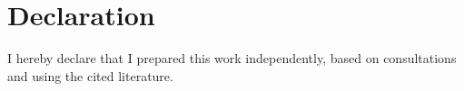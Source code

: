 \thispagestyle{empty}


\section*{Declaration}

\vspace*{\fill}

I hereby declare that I prepared this work independently, based on consultations
and using the cited literature.

\FIITsignPlaceSK \FIITsignDate
\hspace*{\fill} \signaturespace{5cm}{\FIITauthor}
